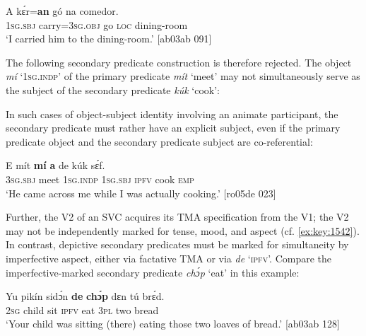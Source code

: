 \ea%
    \label{ex:key:1586}
    \gll A    kɛ́r=\textbf{an}      gó  na  comedor.\\
\textsc{1sg.sbj}  carry=\textsc{3sg.obj}    go  \textsc{loc}  dining-room\\

\glt ‘I carried him to the dining-room.’ [ab03ab 091]
\z

The following secondary predicate construction is therefore rejected. The object \textit{mí} ‘\textsc{1sg.indp}’ of the primary predicate \textit{mít} ‘meet’ may not simultaneously serve as the subject of the secondary predicate \textit{kúk} ‘cook’:


\z

In such cases of object-subject identity involving an animate participant, the secondary predicate must rather have an explicit subject, even if the primary predicate object and the secondary predicate subject are co-referential: 


\ea%
    \label{ex:key:1588}
    \gll E    mít    \textbf{mí}    \textbf{a}    de  kúk    sɛ́f.\\
\textsc{3sg.sbj}  meet  \textsc{1sg.indp}  \textsc{1sg.sbj}  \textsc{ipfv}  cook  \textsc{emp}\\

\glt ‘He came across me while I was actually cooking.’ [ro05de 023]
\z

Further, the V2 of an SVC acquires its TMA specification from the V1; the V2 may not be independently marked for tense, mood, and aspect (cf. \ref{ex:key:1542}). In contrast, depictive secondary predicates must be marked for simultaneity by imperfective aspect, either via factative TMA or via \textit{de} ‘\textsc{ipfv’.} Compare the imperfective-marked secondary predicate \textit{chɔ́p} ‘eat’ in this example: 


\ea%
    \label{ex:key:1589}
    \gll Yu  pikín  sidɔ́n  \textbf{de}  \textbf{chɔ́p}  dɛn  tú  brɛ́d.\\
\textsc{2sg}  child  sit    \textsc{ipfv}  eat    \textsc{3pl}  two  bread\\

\glt ‘Your child was sitting (there) eating those two loaves of bread.’ [ab03ab 128]
\z

